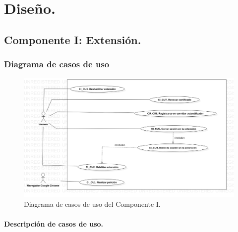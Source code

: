 \documentclass[12pt, a4paper, titlepage]{report}
\begin{document}
	\chapter{\textcolor{azulescom}{Diseño.}}
			
		\section{Componente I: Extensión.}
		 
		    \subsection{Diagrama de casos de uso}
			    
			    \begin{figure}[H]
		            \begin{center}			                \includegraphics[width=14cm]{./imagenes/Disenio/Componente_1/CI_UCD.png}
						\caption{Diagrama de casos de uso del Componente I.}
                    \end{center}    					
				\end{figure}
			    
	        \subsubsection{Descripción de casos de uso.}
			    
\end{document}
